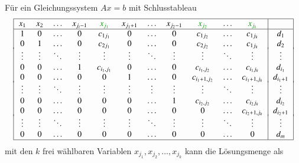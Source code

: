 Für ein Gleichungssystem $Ax=b$ mit Schlusstableau
%
\begin{equation}
\begin{tabular}{|>{$}c<{$}>{$}c<{$}>{$}c<{$}>{$}c<{$}>{$}c<{$}>{$}c<{$}>{$}c<{$}>{$}c<{$}>{$}c<{$}>{$}c<{$}>{$}c<{$}|>{$}c<{$}|}
\hline
   x_1&   x_2&\dots &x_{j_i-1}&{\color{darkgreen}x_{j_1}}&x_{j_1+1}&\dots &x_{j_2-1}&{\color{darkgreen}x_{j_2}}&\dots&{\color{darkgreen}x_{j_k}}& \\
\hline
     1&     0&\dots &        0&c_{1j_1}   &     0&\dots &     0&c_{1j_2}     &\dots &c_{1j_k}     &d_1      \\
     0&     1&\dots &        0&c_{2j_1}   &     0&\dots &     0&c_{2j_2}     &\dots &c_{1j_k}     &d_2      \\[-2pt]
\vdots&\vdots&\ddots&\vdots   &\vdots     &\vdots&\ddots&\vdots&\vdots       &\ddots&\vdots       &\vdots   \\
     0&     0&\dots &        1&c_{i_1,j_1}&     0&\dots &     0&c_{i_1,j_2}  &\dots &c_{i_1j_k}   &d_{i_1}  \\
     0&     0&\dots &        0&          0&     1&\dots &     0&c_{i_1+1,j_2}&\dots &c_{i_1+1,j_k}&d_{i_1+1}\\[-2pt]
\vdots&\vdots&\ddots&\vdots   &\vdots     &\vdots&\vdots&\vdots&\vdots       &\ddots&\vdots       &\vdots   \\
     0&     0&\dots &        0&          0&     0&\dots &     1&c_{i_2,j_2}  &\dots &c_{i_2j_k}   &d_{i_2}  \\
     0&     0&\dots &        0&          0&     0&\dots &     0&            0&\dots &c_{i_2+1,j_k}&d_{i_2+1}\\[-2pt]
\vdots&\vdots&\ddots&\vdots   &\vdots     &\vdots&\ddots&\vdots&\vdots       &\ddots&\vdots       &\vdots   \\
     0&     0&\dots &        0&          0&     0&\dots &     0&            0&\dots &            0&d_{m}    \\
\hline
\end{tabular}
\end{equation}
mit den $k$ frei wählbaren Variablen
$x_{j_1}, x_{j_2},\dots, x_{j_k}$ kann die Lösungsmenge als
